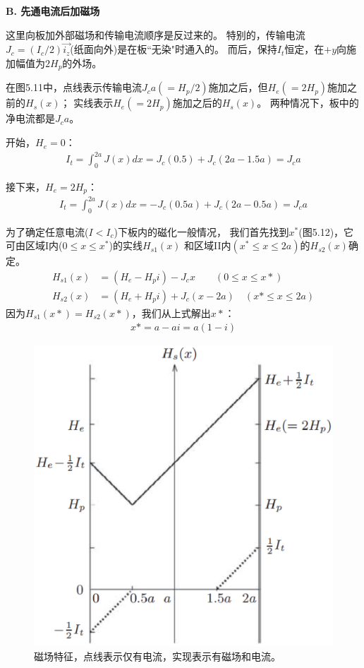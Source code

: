 \textbf{B. 先通电流后加磁场}

这里向板加外部磁场和传输电流顺序是反过来的。
特别的，传输电流$J_c=(I_c/2)\vec{i_z}$(纸面向外)是在板``无染"时通入的。
而后，保持$I_t$恒定，在$+y$向施加幅值为$2H_p$的外场。

在图5.11中，点线表示传输电流$J_c a(=H_p/2)$施加之后，但$H_e(=2H_p)$施加之前的$H_s(x)$；
实线表示$H_e(=2H_p)$施加之后的$H_s(x)$。
两种情况下，板中的净电流都是$J_c a$。

开始，$H_e=0$：
\begin{align*}%
I_{t}=\int_{0}^{2a}J(x)dx=J_{c}(0.5)+J_{c}(2a-1.5a)=J_{c}a
\end{align*}

接下来，$H_e=2H_p$：
\begin{align*}%
I_{t}=\int_{0}^{2a}J(x)dx=-J_{c}(0.5a)+J_{c}(2a-0.5a)=J_{c}a
\end{align*}

为了确定任意电流($I<I_c$)下板内的磁化一般情况，
我们首先找到$x^*$(图5.12)，它可由区域I内($0\le x\le x^*$)的实线$H_{s1}(x)$
和区域II内$(x^*\le x\le 2a)$的$H_{s2}(x)$确定。
\begin{align*}
H_{s1}(x)&=(H_{e}-H_{p}i)-J_{c}x\qquad(0\leq x \leq x*)\\
H_{s2}(x)&=(H_{e}+H_{p}i)+J_{c}(x-2a)\quad(x*\leq x \le  2a)
\end{align*}
因为$H_{s1}(x*)=H_{s2}(x*)$，我们从上式解出$x*$：
\begin{align*}%
x*=a-ai=a(1-i)
\end{align*}

\begin{figure}[htbp]
	\centering
	\includegraphics[scale=0.5]{chpt5/figs/fig5.11.eps}
	\caption{磁场特征，点线表示仅有电流，实现表示有磁场和电流。}
\end{figure}

